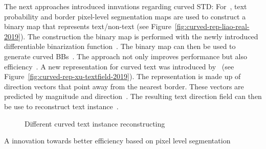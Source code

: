 The next approaches introduced innvations regarding curved \ac{STD}:
For~\cite{liao_real-time_2019}, text probability and border pixel-level segmentation maps are used
to construct a binary map that represents text/non-text (see
Figure~\ref{fig:curved-rep-liao-real-2019}).
The construction the binary map is performed with the newly introduced differentiable binarization
function~\citep{liao_real-time_2019}.
The binary map can then be used to generate curved \acp{BB}~\citep{liao_real-time_2019}.
The approach not only improves performance but also efficiency~\citep{liao_real-time_2019}.
A new representation for curved text was introduced
by~\cite{xu_textfield_2019} (see Figure~\ref{fig:curved-rep-xu-textfield-2019}).
The representation is made up of direction vectors that point away from the nearest border.
These vectors are predicted by magnitude and direction~\citep{xu_textfield_2019}.
The resulting text direction field can then be use to reconstruct text
instance~\citep{xu_textfield_2019}.
\begin{figure}[ht]
    \centering\scriptsize
    \caption{%
        Different curved text instance reconstructing\label{fig:curved-text-representations}
    }
\end{figure}
A innovation towards better efficiency based on pixel level segmentation
